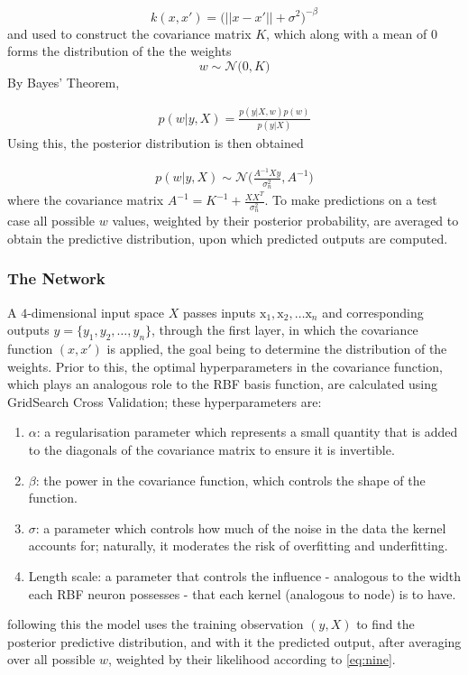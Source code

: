\documentclass[11pt,a4paper]{article}
\begin{document}
$$ k(x,x') = \biggl( ||x-x'|| + \sigma^2\biggr)^{-\beta} $$
and used to construct the covariance matrix $K$, which along with 
a mean of $0$ forms the distribution of the the weights 
$$ w \sim \mathcal{N}\bigl(0, K\bigr)$$
By Bayes' Theorem, 

\begin{align}
    p(w|y, X) = \frac{p(y|X,w) p(w)}{p(y|X)}
\end{align}
Using this, the posterior distribution is then obtained

\begin{align}
    p(w|y, X) \sim \mathcal{N}\bigl(\frac{A^{-1}Xy}{\sigma_{n}^{2}}, A^{-1}\bigr) \label{eq:nine}
\end{align}
where the covariance matrix $A^{-1} = K^{-1} + \frac{XX^T}{\sigma_{n}^2}$.
To make predictions on a test case all possible $w$
values, weighted by their posterior probability, are averaged to obtain the
predictive distribution, upon which predicted outputs are computed. \citep{rasmussen2006}

\subsubsection{The Network}

A $4$-dimensional input space $X$
passes inputs $\boldsymbol{\mathrm{x}}_1, \boldsymbol{\mathrm{x}}_2,\ldots \boldsymbol{\mathrm{x}}_{n}$
and corresponding outputs \( y = \{y_1, y_2, \dots, y_n\} \), through the first
layer, in which the covariance function $(x,x')$
is applied, the goal being to determine the distribution of the weights. Prior to this,
the optimal hyperparameters in the covariance function, which plays an analogous
role to the RBF basis function, are calculated using GridSearch Cross Validation; these hyperparameters are:
\begin{enumerate}
    \item $\alpha$: a regularisation parameter which represents a small quantity
    that is added to the diagonals of the covariance matrix to ensure it is 
    invertible. 
    \item $\beta$: the power in the covariance function, which controls the shape of the function.
    \item $\sigma$: a parameter which controls how much of the noise in the data the kernel accounts for; naturally, 
    it moderates the risk of overfitting and underfitting.
    \item Length scale: a parameter that controls the influence - analogous to 
    the width each RBF neuron possesses - that each kernel (analogous to node) is to have.
\end{enumerate}
following this the model uses the training observation $(y,X)$ to find
the posterior predictive distribution, and with it the predicted output, after 
averaging over all possible $w$, weighted by their likelihood according to \eqref{eq:nine}. 
\end{document}
